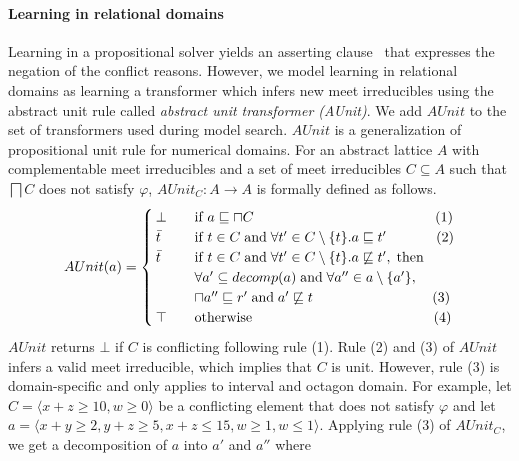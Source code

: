 \paragraph{\textbf{Learning in relational domains}}
Learning in a propositional solver yields an asserting clause~\cite{cdcl} 
that expresses the negation of the conflict reasons.  However, we model 
learning in relational domains as learning a transformer which infers 
new meet irreducibles using the abstract unit rule called 
{\em abstract unit transformer (AUnit)}.  We add $\mathit{AUnit}$ to the set of 
transformers  used during model search. $AUnit$ is 
a generalization of propositional unit rule for numerical domains.  For 
an abstract lattice $A$ with complementable meet irreducibles and a set 
of meet irreducibles $C \subseteq A$ such that $\bigsqcap C$ does not 
satisfy $\varphi$, $\mathit{AUnit}_C: A \rightarrow A$ is formally defined as follows. 
\[ AUnit(a) =
 \begin{cases}
  \bot       & \quad \text{if } a \sqsubseteq \sqcap{C} \qquad \qquad \qquad
  \qquad \qquad \qquad \quad (1)\\
  \bar{t}    & \quad \text{if } t \in C \; \text{and} \; \forall t' \in C
  \setminus \{t\}. a  \sqsubseteq t' \qquad \quad \; \; (2) \\
  \bar{t}    & \quad \text{if } t \in C \; \text{and} \; \forall t' \in C \setminus \{t\}. a
  \not\sqsubseteq t', \; \text{then} \\ 
             & \quad \forall a' \subseteq decomp(a) \;  \text{and} \; \forall a'' \in a \setminus \{a'\}, \\ 
             & \quad \sqcap{a''} \sqsubseteq r' \; \text{and} \; a'
             \not\sqsubseteq t   \qquad \qquad \qquad \qquad \; \; (3) \\
  \top & \quad \text{otherwise} \qquad \qquad \qquad \qquad \qquad \qquad \quad (4) \\
 \end{cases}
\]
$\mathit{AUnit}$ returns $\bot$ if $C$ is conflicting following rule (1).  Rule (2) and
(3) of $\mathit{AUnit}$ infers a valid meet irreducible, which implies that $C$ is unit. 
However, rule (3) is domain-specific and only applies to interval and octagon
domain.  For example, let $C = \langle x+z \geq 10,  w \geq 0 \rangle$ be a 
conflicting element that does not satisfy $\varphi$ and let $a= \langle x+y \geq 2, y+z \geq 5,
x+z \leq 15, w \geq 1, w \leq 1 \rangle$.  Applying rule (3) of $\mathit{AUnit}_C$, we get a 
decomposition of $a$ into $a'$ and $a''$ where 
